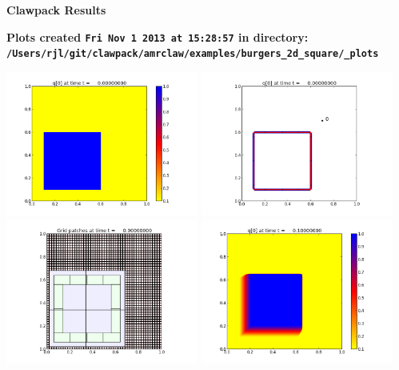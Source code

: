 \documentclass[11pt]{article}
\begin{document}
        \begin{center}{\Large\bf Clawpack Results}\vskip 5pt
        
        \bf Plots created {\tt Fri Nov  1 2013 at 15:28:57} in directory: \vskip 5pt
        \verb+/Users/rjl/git/clawpack/amrclaw/examples/burgers_2d_square/_plots+
        \end{center}
        \vskip 5pt
        \includegraphics[width=0.475\textwidth]{frame0000fig0.png}
\includegraphics[width=0.475\textwidth]{frame0000fig1.png}
\vskip 10pt 
\includegraphics[width=0.475\textwidth]{frame0000fig2.png}
\vskip 10pt 
\includegraphics[width=0.475\textwidth]{frame0001fig0.png}
\end{document}
